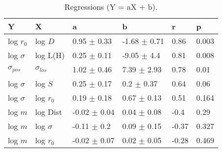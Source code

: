 \begin{table}
\centering
\caption{Regressions (Y = aX + b).}
\begin{tabular}{llllll}
\toprule
              Y &               X &                 a &                 b &      r &      p \\
\midrule
      log $r_0$ &         log $D$ &   0.95 $\pm$ 0.33 &  -1.68 $\pm$ 0.71 &   0.86 &  0.003 \\
   log $\sigma$ &        log L(H) &   0.25 $\pm$ 0.11 &   -9.05 $\pm$ 4.4 &   0.81 &  0.008 \\
 $\sigma_{pos}$ &  $\sigma_{los}$ &   1.02 $\pm$ 0.46 &   7.39 $\pm$ 2.93 &   0.78 &   0.01 \\
   log $\sigma$ &         log $S$ &   0.25 $\pm$ 0.17 &    0.2 $\pm$ 0.37 &   0.64 &   0.06 \\
   log $\sigma$ &     log $r_{0}$ &   0.19 $\pm$ 0.18 &   0.67 $\pm$ 0.13 &   0.51 &  0.164 \\
        log $m$ &        log Dist &  -0.02 $\pm$ 0.04 &   0.04 $\pm$ 0.08 &   -0.4 &   0.29 \\
        log $m$ &    log $\sigma$ &   -0.11 $\pm$ 0.2 &   0.09 $\pm$ 0.15 &  -0.37 &  0.327 \\
        log $m$ &     log $r_{0}$ &  -0.02 $\pm$ 0.07 &   0.02 $\pm$ 0.05 &  -0.28 &  0.469 \\
\bottomrule
\end{tabular}
\end{table}
